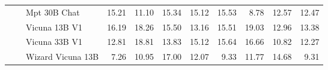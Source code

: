 \begin{table}[!htbp]
\begin{tabular}{l|l|l|rrrr|rrrr}
 &  & Mpt 30B Chat & {\cellcolor[HTML]{FDD8D5}} \color[HTML]{000000} 15.21 & {\cellcolor[HTML]{FEE7E4}} \color[HTML]{000000} 11.10 & {\cellcolor[HTML]{FDD8D5}} \color[HTML]{000000} 15.34 & {\cellcolor[HTML]{FDD9D6}} \color[HTML]{000000} 15.12 & {\cellcolor[HTML]{E1F4F6}} \color[HTML]{000000} 15.53 & {\cellcolor[HTML]{EEF8FB}} \color[HTML]{000000} 8.78 & {\cellcolor[HTML]{E8F6FA}} \color[HTML]{000000} 12.57 & {\cellcolor[HTML]{E8F6FA}} \color[HTML]{000000} 12.47 \\
 &  & Vicuna 13B V1 & {\cellcolor[HTML]{FDD5D1}} \color[HTML]{000000} 16.19 & {\cellcolor[HTML]{FCCDC9}} \color[HTML]{000000} 18.26 & {\cellcolor[HTML]{FDD7D4}} \color[HTML]{000000} 15.50 & {\cellcolor[HTML]{FDE0DD}} \color[HTML]{000000} 13.16 & {\cellcolor[HTML]{E1F4F6}} \color[HTML]{000000} 15.51 & {\cellcolor[HTML]{D8F0EF}} \color[HTML]{000000} 19.03 & {\cellcolor[HTML]{E7F6F9}} \color[HTML]{000000} 12.96 & {\cellcolor[HTML]{E6F5F9}} \color[HTML]{000000} 13.38 \\
 &  & Vicuna 33B V1 & {\cellcolor[HTML]{FDE1DE}} \color[HTML]{000000} 12.81 & {\cellcolor[HTML]{FCCBC6}} \color[HTML]{000000} 18.81 & {\cellcolor[HTML]{FDDEDB}} \color[HTML]{000000} 13.83 & {\cellcolor[HTML]{FDD9D6}} \color[HTML]{000000} 15.12 & {\cellcolor[HTML]{E1F4F6}} \color[HTML]{000000} 15.64 & {\cellcolor[HTML]{DFF3F4}} \color[HTML]{000000} 16.66 & {\cellcolor[HTML]{EBF7FA}} \color[HTML]{000000} 10.82 & {\cellcolor[HTML]{E8F6FA}} \color[HTML]{000000} 12.27 \\
 &  & Wizard Vicuna 13B  & {\cellcolor[HTML]{FFF3F0}} \color[HTML]{000000} 7.26 & {\cellcolor[HTML]{FEE7E4}} \color[HTML]{000000} 10.95 & {\cellcolor[HTML]{FCD1CD}} \color[HTML]{000000} 17.00 & {\cellcolor[HTML]{FDE4E0}} \color[HTML]{000000} 12.07 & {\cellcolor[HTML]{EDF8FB}} \color[HTML]{000000} 9.33 & {\cellcolor[HTML]{E9F7FA}} \color[HTML]{000000} 11.77 & {\cellcolor[HTML]{E3F4F8}} \color[HTML]{000000} 14.68 & {\cellcolor[HTML]{EDF8FB}} \color[HTML]{000000} 9.31 \\


\end{tabular}
\end{table}
